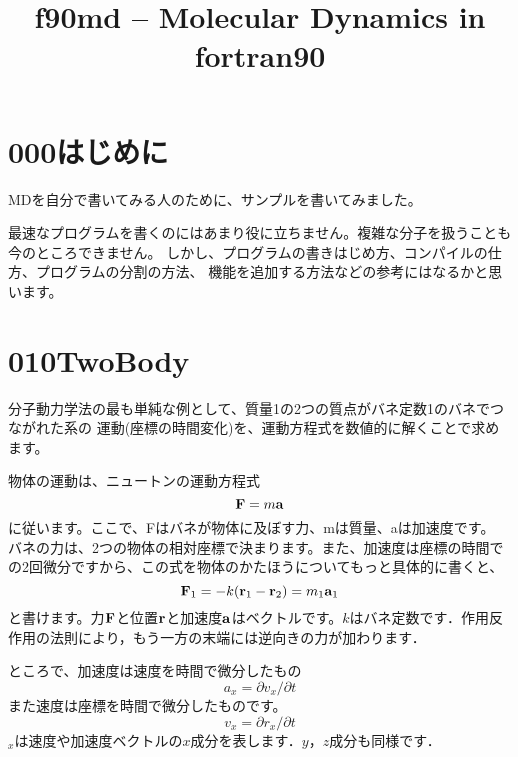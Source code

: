 \documentclass[a4,10pt]{article}
\title{f90md -- Molecular Dynamics in fortran90}
\begin{document}
\maketitle
\section{000はじめに}
MDを自分で書いてみる人のために、サンプルを書いてみました。

最速なプログラムを書くのにはあまり役に立ちません。複雑な分子を扱うことも今のところできません。
しかし、プログラムの書きはじめ方、コンパイルの仕方、プログラムの分割の方法、
機能を追加する方法などの参考にはなるかと思います。


\section{010TwoBody}

分子動力学法の最も単純な例として、質量1の2つの質点がバネ定数1のバネでつながれた系の
運動(座標の時間変化)を、運動方程式を数値的に解くことで求めます。

物体の運動は、ニュートンの運動方程式
\begin{equation}
  {\bf F} = m {\bf a}
\end{equation}
に従います。ここで、Fはバネが物体に及ぼす力、mは質量、aは加速度です。
バネの力は、2つの物体の相対座標で決まります。また、加速度は座標の時間での2回微分ですから、この式を物体のかたほうについてもっと具体的に書くと、
\begin{equation}\label{eq:f_sp}
{\bf F}_1 = -k ({\bf r}_1- {\bf r}_2) = m_1 {\bf a}_1
\end{equation}
と書けます。力$\bf F$と位置$\bf r$と加速度$\bf a$はベクトルです。$k$はバネ定数です．作用反作用の法則により，もう一方の末端には逆向きの力が加わります．

ところで、加速度は速度を時間で微分したもの
\begin{equation}
a_x = \partial v_x / \partial t
\end{equation}
また速度は座標を時間で微分したものです。
\begin{equation}
v_x = \partial r_x / \partial t
\end{equation}
$_x$は速度や加速度ベクトルの$x$成分を表します．$y$，$z$成分も同様です．
\end{document}
